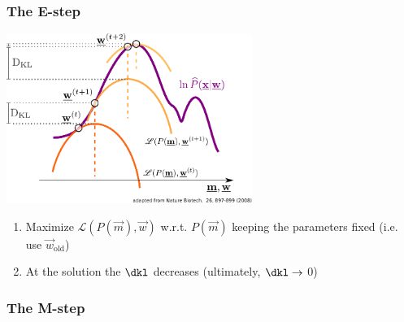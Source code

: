 \subsubsection{The E-step}

\begin{frame}{\subsubsecname}

\svspace{-3mm}

\begin{center}
	\includegraphics[width=0.6\textwidth]{img/emconverge}
\end{center}

\svspace{-5mm}


\svspace{-5mm}

\begin{enumerate}
\item Maximize $\mathscr{L}(P(\vec m), \vec w)$ w.r.t. $P(\vec m)$ keeping the parameters fixed (i.e. use $\vec w_{\text{old}}$)
\item At the solution the $\dkl$ decreases (ultimately, $\dkl \rightarrow$ 0)
\end{enumerate}

\end{frame}

\subsubsection{The M-step}

